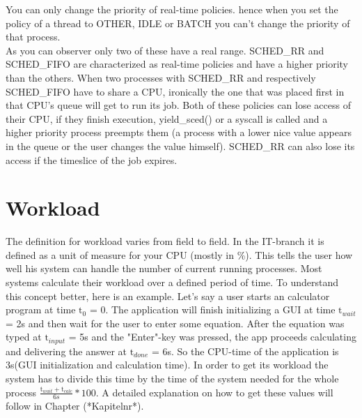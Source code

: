 You can only change the priority of real-time policies. hence when you set the policy of a thread to OTHER, IDLE or BATCH you can't change the priority of that process.\\
As you can observer only two of these have a \dq real\dq{} range.
SCHED\_RR and SCHED\_FIFO are characterized as real-time policies and have a higher priority than the
others. When two processes with SCHED\_RR and respectively SCHED\_FIFO have to share a CPU,
ironically the one that was placed first in that CPU's queue will get to run its job. Both of these
policies can lose access of their CPU, if they finish execution, yield\_sced() or a syscall is called
and a higher priority process preempts them (a process with a lower nice value appears in the queue
or the user changes the value himself). SCHED\_RR can also lose its access if the timeslice of
the job expires.

\section{Workload}
The definition for workload varies from field to field. In the IT-branch it is defined as a unit of measure for your CPU (mostly in \%). This tells the user how well his system can handle the number of current running processes. Most systems calculate their workload over a defined period of time. To understand this concept better, here is an example. Let's say a user starts an calculator program at time $\mathrm{t}_0$ = 0. The application will finish initializing a GUI at time $\mathrm{t}_{wait}$ = 2s and then wait for the user to enter some equation.
After the equation was typed at $\mathrm{t}_{input}$ = 5s and the "Enter"-key was pressed, the app proceeds calculating and delivering the answer at $\mathrm{t}_{done}$ = 6s. So the CPU-time of the application is 3s(GUI initialization and calculation time). In order to get its workload the system has to divide this time by the time of the system needed for the whole process $\frac{\mathrm{t}_{wait}+\mathrm{t}_{calc}}{6s}*100$.
A detailed explanation on how to get these values will follow in Chapter (*Kapitelnr*).